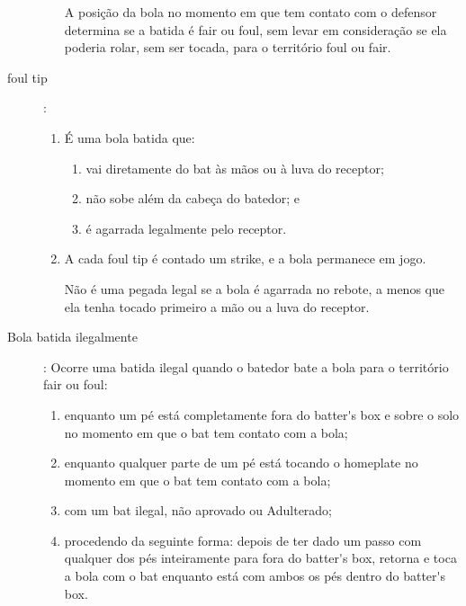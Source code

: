 \begin{description}
\begin{enumerate}[label=\alph*)]
		A posi\c{c}\~ao da bola no momento em que tem contato com o defensor determina se a batida \'e \gls{fair} ou \gls{foul}, sem levar em considera\c{c}\~ao se ela poderia rolar, sem ser tocada, para o territ\'orio \gls{foul} ou \gls{fair}. 
	\end{enumerate}

	\item[\Gls{foul tip}]:
	
	\begin{enumerate}[label=\alph*)]
		\item \'E uma bola batida que:
		\begin{enumerate}[label=\roman*.]
			\item vai diretamente do \gls{bat} \`as m\~aos ou \`a luva do receptor; 
			\item n\~ao sobe al\'em da cabe\c{c}a do batedor; e 
			\item \'e agarrada legalmente pelo receptor. 
		\end{enumerate}
		\item  A cada \Gls{foul tip} \'e contado um \gls{strike}, e a bola permanece em jogo. 
		
		N\~ao \'e uma pegada legal se a bola \'e agarrada no rebote, a menos que ela tenha tocado primeiro a m\~ao ou a luva do receptor. 
	\end{enumerate}


	\item[Bola batida ilegalmente]: Ocorre uma batida ilegal quando o batedor bate a bola para o territ\'orio \gls{fair} ou \gls{foul}: 

	\begin{enumerate}[label=\alph*)]
		\item enquanto um p\'e est\'a completamente fora do \gls{batter's box} e sobre o solo no momento em que o \gls{bat} tem contato com a bola; 
		
		\item  enquanto qualquer parte de um p\'e est\'a tocando o \gls{homeplate} no momento em que o \gls{bat} tem contato com a bola; 
		
		\item  com um \gls{bat} ilegal, n\~ao aprovado ou Adulterado;
		
		\item procedendo da seguinte forma: depois de ter dado um passo com qualquer dos p\'es 	inteiramente para fora do \gls{batter's box}, retorna e toca a bola com o \gls{bat} enquanto est\'a com ambos os p\'es dentro do \gls{batter's box}. 
	\end{enumerate}


\end{description}
